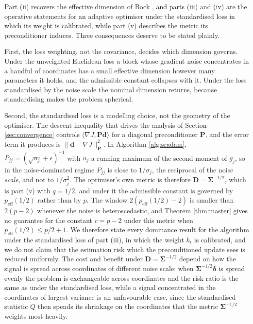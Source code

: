 \documentclass[pdflatex,sn-mathphys-num]{sn-jnl}%
\theoremstyle{thmstyleone}%
\theoremstyle{thmstyletwo}%
\theoremstyle{thmstylethree}%
\newcommand{\rev}[1]{{\color{blue}#1}}
\newenvironment{revblock}{\color{blue}}{}
\newcommand{\peffq}[1]{p_{\mathrm{eff}}(#1)}
\begin{document}
Part (ii) recovers the effective dimension of Bock \cite{bock1975}, and parts (iii) and (iv) are the operative statements for an adaptive optimiser\rev{ under the standardised loss in which its weight is calibrated, while part (v) describes the metric its preconditioner induces}. Three consequences deserve to be stated plainly.

First, the loss weighting, not the covariance, decides which dimension governs. Under the unweighted Euclidean loss a block whose gradient noise concentrates in a handful of coordinates has a small effective dimension however many parameters it holds, and the admissible constant collapses with it. Under the loss standardised by the noise scale the nominal dimension returns, because standardising makes the problem spherical.

\begin{revblock}
Second, the standardised loss is a modelling choice, not the geometry of the optimiser. The descent inequality that drives the analysis of Section \ref{sec:convergence} controls $\langle\nabla J,\bm P\bm d\rangle$ for a diagonal preconditioner $\bm P$, and the error term it produces is $\|\bm d-\nabla J\|^2_{\bm P}$. In Algorithm \ref{alg:sradam}, $P_{jj}=(\sqrt{u_j}+\epsilon)^{-1}$ with $u_j$ a running maximum of the second moment of $g_j$, so in the noise-dominated regime $P_{jj}$ is close to $1/\sigma_j$, the reciprocal of the noise \emph{scale}, and not to $1/\sigma^2_j$. The optimiser's own metric is therefore $\bm D=\bm\Sigma^{-1/2}$, which is part (v) with $q=1/2$, and under it the admissible constant is governed by $\peffq{1/2}$ rather than by $p$. The window $2(\peffq{1/2}-2)$ is smaller than $2(p-2)$ whenever the noise is heteroscedastic, and Theorem \ref{thm:master} gives no guarantee for the constant $c=p-2$ under this metric when $\peffq{1/2}\le p/2+1$. We therefore state every dominance result for the algorithm under the standardised loss of part (iii), in which the weight $k_t$ is calibrated, and we do not claim that the estimation risk which the preconditioned update sees is reduced uniformly. The cost and benefit under $\bm D=\bm\Sigma^{-1/2}$ depend on how the signal is spread across coordinates of different noise scale: when $\bm\Sigma^{-1/2}\bm\delta$ is spread evenly the problem is exchangeable across coordinates and the risk ratio is the same as under the standardised loss, while a signal concentrated in the coordinates of largest variance is an unfavourable case, since the standardised statistic $Q$ then spends its shrinkage on the coordinates that the metric $\bm\Sigma^{-1/2}$ weights most heavily.
\end{revblock}
\end{document}
